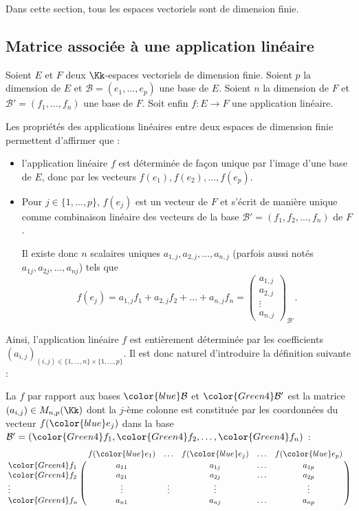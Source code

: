 \documentclass[class=report,crop=false]{standalone}
\begin{document}
Dans cette section, tous les espaces vectoriels sont de dimension finie.

\subsection{Matrice associée à une application linéaire}

Soient $E$ et $F$ deux $\Kk$-espaces vectoriels de dimension finie.
Soient $p$ la dimension de $E$ et $\mathcal{B}=(e_1, \dots ,e_p)$
une base de $E$.
Soient $n$ la dimension de $F$ et
$\mathcal{B}'=(f_1, \dots ,f_n)$ une base de $F$.
Soit enfin $f : E \to F$ une application linéaire.



Les propriétés des applications linéaires entre deux espaces
de dimension finie permettent d'affirmer que :
\begin{itemize}
  \item l'application linéaire $f$ est déterminée de façon unique par l'image
d'une base de $E$, donc par les vecteurs
$f(e_1), f(e_2), \ldots, f(e_p)$.

  \item Pour $j \in \{1,\ldots,p\}$, $f(e_j)$
est un vecteur de $F$ et s'écrit de manière unique comme combinaison
linéaire des vecteurs de la base $\mathcal{B}'=(f_1,f_2, \ldots , f_n) $ de $F$.

Il existe donc $n$ scalaires uniques $a_{1,j},a_{2,j}, \ldots , a_{n,j}$
(parfois aussi notés $a_{1j},a_{2j}, \ldots , a_{nj}$)
tels que
$$f (e_j)=a_{1,j}f_1+a_{2,j}f_2+\dots +a_{n,j}f_n = \begin{pmatrix}a_{1,j}\\a_{2,j}\\ \vdots \\a_{n,j}\end{pmatrix}_{\!\!\mathcal{B}'}.$$
\end{itemize}
Ainsi, l'application linéaire $f$ est entièrement déterminée par les
coefficients $(a_{i,j})_{(i,j) \in \{1,\ldots,n\} \times \{1,\ldots,p\}}$. Il est donc
naturel d'introduire la définition suivante :
\begin{definition}
La  $f$ par
rapport aux bases ${\color{blue}\mathcal{B}}$ et ${\color{Green4}\mathcal{B}'}$ est
la matrice $(a_{i,j}) \in M_{n,p}(\Kk)$
dont la $j$-ème colonne est constituée par les coordonnées du vecteur
$f({\color{blue}e_j})$ dans la base
$\mathcal{B}'=({\color{Green4}f_1}, {\color{Green4}f_2}, \ldots ,{\color{Green4}f_n})$ :
$$\bordermatrix{    & f({\color{blue}e_1})& \ldots & f({\color{blue}e_j})  &\ldots  & f({\color{blue}e_p})\cr
 {\color{Green4}f_1} & a_{11} &        & a_{1j} & \ldots & a_{1p}\cr
 {\color{Green4}f_2} & a_{21} &        & a_{2j} & \ldots & a_{2p}\cr
             \vdots & \vdots & \vdots & \vdots &        & \vdots\cr
 {\color{Green4}f_n} & a_{n1} &        & a_{nj} & \ldots & a_{np}}$$
\end{definition}
\end{document}
